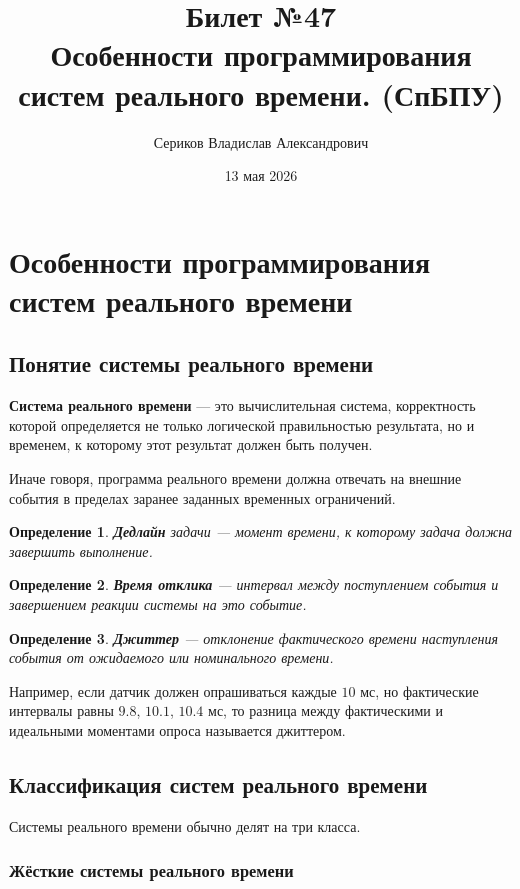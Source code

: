 \documentclass[12pt,a4paper]{article}
\title{Билет №47 \\ \small Особенности программирования систем реального времени. (СпБПУ)}
\author{Сериков Владислав Александрович}
\date{13 мая 2026}
\newtheorem{definition}{Определение}
\begin{document}
\maketitle
\tableofcontents
\newpage

\section{Особенности программирования систем реального времени}

\subsection{Понятие системы реального времени}

\textbf{Система реального времени} --- это вычислительная система, корректность которой определяется не только логической правильностью результата, но и временем, к которому этот результат должен быть получен.

Иначе говоря, программа реального времени должна отвечать на внешние события в пределах заранее заданных временных ограничений.

\begin{definition}
\textbf{Дедлайн} задачи --- момент времени, к которому задача должна завершить выполнение.
\end{definition}

\begin{definition}
\textbf{Время отклика} --- интервал между поступлением события и завершением реакции системы на это событие.
\end{definition}

\begin{definition}
\textbf{Джиттер} --- отклонение фактического времени наступления события от ожидаемого или номинального времени.
\end{definition}

Например, если датчик должен опрашиваться каждые $10$ мс, но фактические интервалы равны $9.8$, $10.1$, $10.4$ мс, то разница между фактическими и идеальными моментами опроса называется джиттером.

\subsection{Классификация систем реального времени}

Системы реального времени обычно делят на три класса.

\subsubsection{Жёсткие системы реального времени}
\end{document}
